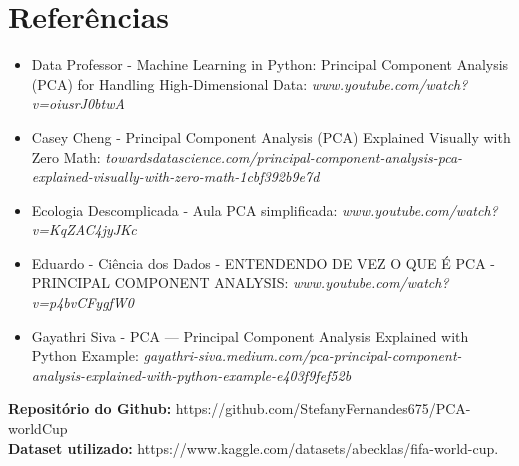 \documentclass{article}
\begin{document}
\newpage
\section{Referências}
\begin{itemize}
  \item Data Professor - Machine Learning in Python: Principal Component Analysis (PCA) for Handling High-Dimensional Data: 
  \newline \emph{www.youtube.com/watch?v=oiusrJ0btwA}
  \item Casey Cheng - Principal Component Analysis (PCA) Explained Visually with Zero Math: 
  \newline \emph{towardsdatascience.com/principal-component-analysis-pca-explained-visually-with-zero-math-1cbf392b9e7d}
  \item Ecologia Descomplicada - Aula PCA simplificada: 
  \newline \emph{www.youtube.com/watch?v=KqZAC4jyJKc}
  \item Eduardo - Ciência dos Dados - ENTENDENDO DE VEZ O QUE É PCA - PRINCIPAL COMPONENT ANALYSIS: 
  \newline \emph{www.youtube.com/watch?v=p4bvCFygfW0}
  \item Gayathri Siva - PCA — Principal Component Analysis Explained with Python Example:
  \newline \emph{gayathri-siva.medium.com/pca-principal-component-analysis-explained-with-python-example-e403f9fef52b}
\end{itemize}

\vspace{4cm}
\begin{center} 
    \textbf{Repositório do Github:}
    https://github.com/StefanyFernandes675/PCA-worldCup \\
    \textbf{Dataset utilizado:}
    https://www.kaggle.com/datasets/abecklas/fifa-world-cup.
\end{center} 
\end{document}
